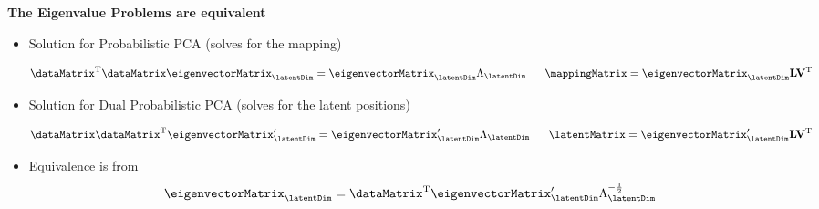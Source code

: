 \textbf{The Eigenvalue Problems are equivalent}
\begin{itemize}
\item Solution for Probabilistic PCA (solves for the mapping)


\[
\dataMatrix^{\mathrm{T}}\dataMatrix\eigenvectorMatrix_{\latentDim}=\eigenvectorMatrix_{\latentDim}\Lambda_{\latentDim}\,\,\,\,\,\,\,\,\,\,\mappingMatrix=\eigenvectorMatrix_{\latentDim}\mathbf{L}\mathbf{V}^{\mathrm{T}}\]


\item Solution for Dual Probabilistic PCA (solves for the latent positions)


\[
\dataMatrix\dataMatrix^{\mathrm{T}}\eigenvectorMatrix_{\latentDim}^{\prime}=\eigenvectorMatrix_{\latentDim}^{\prime}\Lambda_{\latentDim}\,\,\,\,\,\,\,\,\,\,\latentMatrix=\eigenvectorMatrix_{\latentDim}^{\prime}\mathbf{L}\mathbf{V}^{\mathrm{T}}\]


\item Equivalence is from\[
\eigenvectorMatrix_{\latentDim}=\dataMatrix^{\mathrm{T}}\eigenvectorMatrix_{\latentDim}^{\prime}\Lambda_{\latentDim}^{-\frac{1}{2}}\]

\end{itemize}





